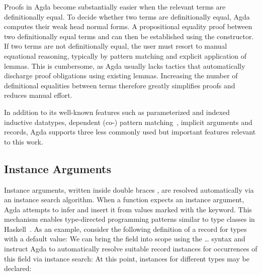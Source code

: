 \documentclass[screen,nonacm]{acmart}
\begin{document}
Proofs in Agda become substantially easier when the relevant terms are
definitionally equal. To decide whether two terms are definitionally equal,
Agda computes their weak head normal forms. A propositional equality proof
   between two definitionally equal
terms  and  can then be established using the
 constructor. If two terms are not
definitionally equal, the user must resort to manual equational reasoning,
typically by pattern matching and explicit application of lemmas. This is
cumbersome, as Agda usually lacks tactics that automatically discharge proof
obligations using existing lemmas. Increasing the number of definitional
equalities between terms therefore greatly simplifies proofs and reduces manual
effort.

In addition to its well-known features such as parameterized and indexed
inductive datatypes, dependent (co-) pattern matching~\cite{10.1145/3236770},
implicit arguments and records, Agda supports three less commonly used but
important features relevant to this work.

\subsection*{Instance Arguments}
Instance arguments, written inside double braces \AgdaSymbol{\{\{\dots\}\}},
are resolved automatically via an instance search algorithm. When a function
expects an instance argument, Agda attempts to infer and insert it from values
marked with the  keyword. This mechanism enables
type-directed programming patterns similar to type classes in
Haskell~\cite{10.1145/75277.75283}. As an example, consider the following
definition of a record for types with a default value: \EDefault{}We can bring
the  field into scope using the  \dots
\AgdaSymbol{\{\{\dots\}\}} syntax and instruct Agda to automatically resolve
suitable record instances for occurrences of this field via instance search:
\EDefFields{}At this point, instances for different types may be declared:

\noindent\begin{minipage}[t]{0.48\linewidth}
      \raggedright{}
      \EDefInst{}
\end{minipage}
\begin{minipage}[t]{0.48\linewidth}
      \raggedright{}
      \EDefInstS{}
\end{minipage}
\end{document}
